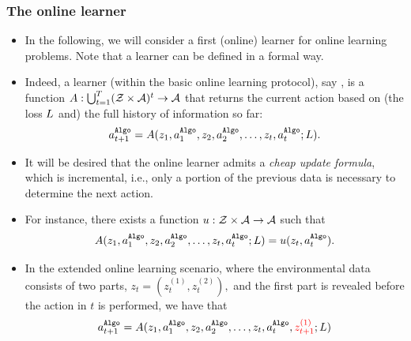 \begin{frame}
	\frametitle{The online learner}
	\small
	\begin{itemize}
		\item In the following, we will consider a first (online) learner for   online learning problems. Note that a learner can be defined in a formal way.
		\item Indeed, a learner (within the basic online learning protocol), say \Algo, is a function $A: \bigcup_{t=1}^T (\mathcal{Z} \times \mathcal{A})^t \to \mathcal{A}$ that returns the current action based on (the loss $L$ and) the full history of information so far:
		$$	a_{t+1}^{\texttt{Algo}} = A(z_1,a_1^{\texttt{Algo}},z_2,a_2^{\texttt{Algo}},\ldots,z_t,a_t^{\texttt{Algo}};L).		$$
		 \item It will be desired that the online learner admits a \emph{cheap update formula}, which is incremental, i.e., only a portion of the previous data is necessary to determine the next action.
		 \item  For instance, there exists a function $u:\mathcal{Z} \times \mathcal{A} \to \mathcal{A}$ such that 
		$$	A(z_1,a_1^{\texttt{Algo}},z_2,a_2^{\texttt{Algo}},\ldots,z_t,a_t^{\texttt{Algo}};L) = u(z_t,a_t^{\texttt{Algo}}).$$
%		
		\item In the extended online learning scenario, where the environmental data consists of two parts, $z_t=(z_t^{(1)},z_t^{(2)}   ),$ and the {\color{red}first part is revealed before the action in $t$ is performed}, we have that
				$$	a_{t+1}^{\texttt{Algo}} =  A(z_1,a_1^{\texttt{Algo}},z_2,a_2^{\texttt{Algo}},\ldots,z_t,a_t^{\texttt{Algo}},{\color{red} z_{t+1}^{(1)}};L)  		$$
				 
	\end{itemize}
\end{frame}

